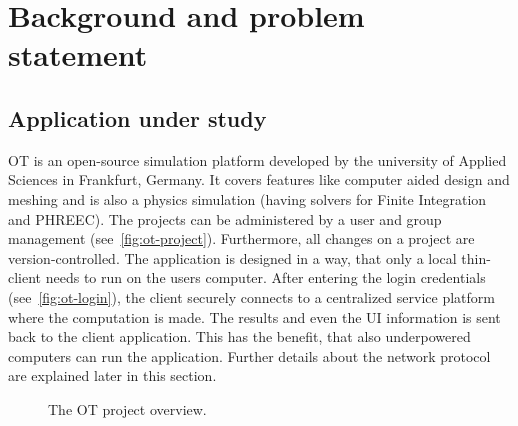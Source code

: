 
\chapter{Background and problem statement} %

\label{chap:background} %


\section{Application under study}
\acf{OT} is an open-source simulation platform developed by the university of Applied Sciences in Frankfurt, Germany. It covers features like computer aided design and meshing and is also a physics simulation (having solvers for Finite Integration and PHREEC). The projects can be administered by a user and group management (see~\autoref{fig:ot-project}). Furthermore, all changes on a project are version-controlled. The application is designed in a way, that only a local thin-client needs to run on the users computer. After entering the login credentials (see~\autoref{fig:ot-login}), the client securely connects to a centralized service platform where the computation is made. The results and even the \ac{UI} information is sent back to the client application.  This has the benefit, that also underpowered computers can run the application.
Further details about the network protocol are explained later in this section.

\begin{figure}[ht]
	\centering
	\caption{The \ac{OT} project overview.}
	\label{fig:ot-project}
\end{figure}

